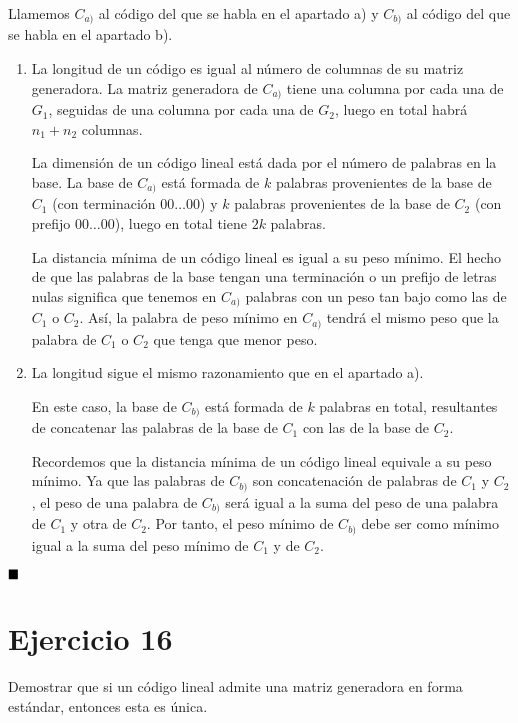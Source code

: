 Llamemos $C_{a)}$ al código del que se habla en el apartado a) y $C_{b)}$ al código del que se habla en el apartado b).

\begin{enumerate}[label=\alph*)]
	\item La longitud de un código es igual al número de columnas de su matriz generadora. La matriz generadora de $C_{a)}$ tiene una columna por cada una de $G_1$, seguidas de una columna por cada una de $G_2$, luego en total habrá $n_1 + n_2$ columnas.
	
	La dimensión de un código lineal está dada por el número de palabras en la base. La base de $C_{a)}$ está formada de $k$ palabras provenientes de la base de $C_1$ (con terminación $00\hdots00$) y $k$ palabras provenientes de la base de $C_2$ (con prefijo $00\hdots00$), luego en total tiene $2k$ palabras.
	
	La distancia mínima de un código lineal es igual a su peso mínimo. El hecho de que las palabras de la base tengan una terminación o un prefijo de letras nulas significa que tenemos en $C_{a)}$ palabras con un peso tan bajo como las de $C_1$ o $C_2$. Así, la palabra de peso mínimo en $C_{a)}$ tendrá el mismo peso que la palabra de $C_1$ o $C_2$ que tenga que menor peso.
	
	\item La longitud sigue el mismo razonamiento que en el apartado a).
	
	En este caso, la base de $C_{b)}$ está formada de $k$ palabras en total, resultantes de concatenar las palabras de la base de $C_1$ con las de la base de $C_2$.
	
	Recordemos que la distancia mínima de un código lineal equivale a su peso mínimo. Ya que las palabras de $C_{b)}$ son concatenación de palabras de $C_1$ y $C_2$, el peso de una palabra de $C_{b)}$ será igual a la suma del peso de una palabra de $C_1$ y otra de $C_2$. Por tanto, el peso mínimo de $C_{b)}$ debe ser como mínimo igual a la suma del peso mínimo de $C_1$ y de $C_2$.
\end{enumerate}

$\qed$

\section{Ejercicio 16}

\begin{formulationBox}
	Demostrar que si un código lineal admite una matriz generadora en forma estándar, entonces esta es única.
\end{formulationBox}

